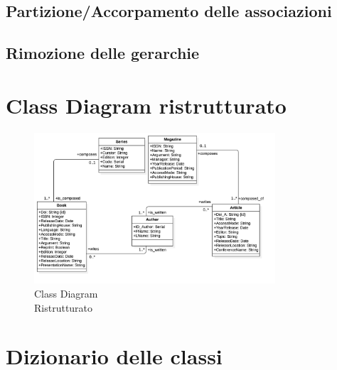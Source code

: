         \subsection{Partizione/Accorpamento delle associazioni}
            
        \subsection{Rimozione delle gerarchie}
    
    \section{Class Diagram ristrutturato}
  
    \begin{figure}

	\centering
	\includegraphics[width=0.8\textwidth]{Immagini/ClassDiagramRIS.png}
	\caption{Class Diagram \\ Ristrutturato}
	\label{fig:ClassDiagramRIS}
	\end{figure}

\newpage
\section{Dizionario delle classi}

